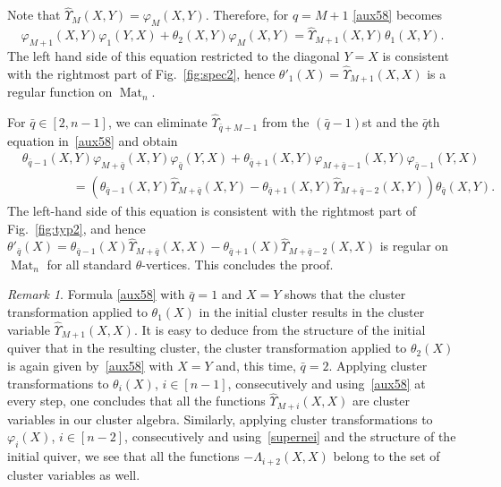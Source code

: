 \documentclass{amsart}
\theoremstyle{definition}
\theoremstyle{remark}
\newtheorem{remark}[theorem]{Remark}
\numberwithin{equation}{section}
\numberwithin{theorem}{section}
\begin{document}
 Note that $\hat\Upsilon_M(X,Y)={{\varphi}}_M(X,Y)$. Therefore, 
 for $q=M+1$ \eqref{aux58} becomes
 \begin{equation*}
 {{\varphi}}_{M+1}(X,Y){{\varphi}}_{1}(Y,X)  + {{\theta}}_{2}(X,Y) {{\varphi}}_{M}(X,Y) = \hat\Upsilon_{M+1}(X,Y) {{\theta}}_{1}(X,Y).
\end{equation*}
The left hand side of this equation restricted to the diagonal $Y=X$ is consistent with the rightmost 
part of Fig.~\ref{fig:spec2},
hence ${{\theta}}'_1(X)=\hat\Upsilon_{M+1}(X,X)$ is a regular function on ${\operatorname{Mat}}_n$.

For $\bar q\in [2, n-1]$, we can eliminate $\hat\Upsilon_{\bar q+M-1}$ from the $(\bar q-1)$st and the $\bar q$th 
equation  in~\eqref{aux58} and obtain 
\begin{equation*}
\begin{aligned}
&  {{\theta}}_{\bar q-1}(X,Y) {{\varphi}}_{M+\bar q}(X,Y) {{\varphi}}_{\bar q}(Y,X)+ {{\theta}}_{\bar q+1}(X,Y)
{{\varphi}}_{M+\bar q-1}(X,Y) {{\varphi}}_{\bar q-1}(Y,X) \\
&\qquad\qquad=\left ({{\theta}}_{\bar q-1}(X,Y) \hat\Upsilon_{M+\bar q}(X,Y)- {{\theta}}_{\bar q+1}(X,Y) 
\hat\Upsilon_{M+\bar q-2}(X,Y)\right ) 
{{\theta}}_{\bar q}(X,Y). 
\end{aligned}
\end{equation*}
The left-hand side of this equation 
is consistent with the rightmost part of Fig.~\ref{fig:typ2},  
and hence 
${{\theta}}'_{\bar q}(X)={{\theta}}_{\bar q-1}(X) \hat\Upsilon_{M+\bar q}(X,X)- 
{{\theta}}_{\bar q+1}(X) \hat\Upsilon_{M+\bar q-2}(X,X)$ is regular on ${\operatorname{Mat}}_n$ for all standard ${{\theta}}$-vertices.
 This concludes the proof.

\begin{remark}
 \label{more_cl_var}
 {\rm Formula \eqref{aux58} with $\bar q = 1$ and $X=Y$ shows that the cluster transformation applied to
 ${{\theta}}_1(X)$ in the initial cluster results in the cluster variable $\hat \Upsilon_{M+1}(X, X)$.
 It is easy to deduce from the structure of the initial quiver that in the resulting cluster, the cluster transformation
 applied to ${{\theta}}_2(X)$ is again given by~\eqref{aux58} with  $X=Y$ and, this time, $\bar q = 2$. Applying cluster
 transformations to ${{\theta}}_i(X)$, $i\in [n-1]$, consecutively and using~\eqref{aux58} at every step, one concludes
 that all the functions $\hat \Upsilon_{M+i}(X, X)$ are cluster variables in our cluster algebra. Similarly,
 applying cluster
 transformations to ${{\varphi}}_i(X)$, $i\in [n-2]$, consecutively and using~\eqref{supernei} and the structure of the initial quiver,
 we see that all the functions $-\Lambda_{i+2}(X,X)$ belong to the set of cluster variables as well.
 }
 \end{remark}
\end{document}
